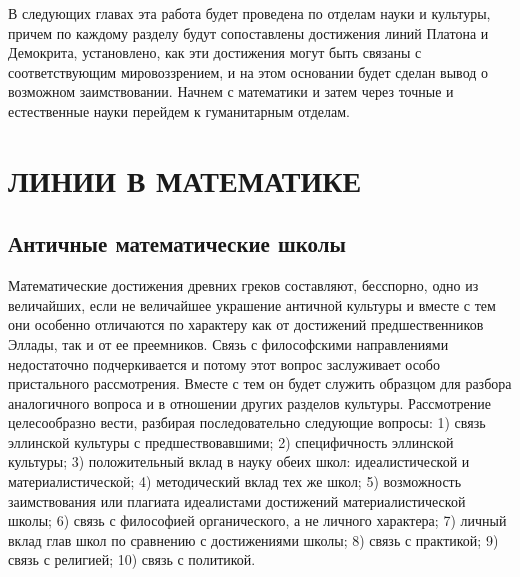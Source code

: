 В  следующих главах  эта работа  будет  проведена по  отделам науки  и
культуры,  причем по  каждому  разделу  будут сопоставлены  достижения
линий Платона и Демокрита, установлено,  как эти достижения могут быть
связаны с  соответствующим мировоззрением,  и на этом  основании будет
сделан вывод  о возможном заимствовании.  Начнем с математики  и затем
через точные и естественные науки перейдем к гуманитарным отделам.

\clearpage

\section{ЛИНИИ В МАТЕМАТИКЕ}

\subsection{Античные математические школы}

Математические достижения  древних греков составляют,  бесспорно, одно
из  величайших,   если  не  величайшее  украшение   античной  культуры
и  вместе  с   тем  они  особенно  отличаются  по   характеру  как  от
достижений  предшественников Эллады,  так  и от  ее преемников.  Связь
с  философскими  направлениями  недостаточно подчеркивается  и  потому
этот  вопрос заслуживает  особо  пристального  рассмотрения. Вместе  с
тем  он будет  служить  образцом для  разбора  аналогичного вопроса  и
в  отношении  других  разделов  культуры.  Рассмотрение  целесообразно
вести, разбирая последовательно следующие  вопросы: 1) связь эллинской
культуры  с предшествовавшими;  2)  специфичность эллинской  культуры;
3)  положительный   вклад  в  науку  обеих   школ:  идеалистической  и
материалистической; 4) методический вклад  тех же школ; 5) возможность
заимствования или  плагиата идеалистами  достижений материалистической
школы; 6) связь с философией органического, а не личного характера; 7)
личный вклад глав  школ по сравнению с достижениями школы;  8) связь с
практикой; 9) связь с религией; 10) связь с политикой.

